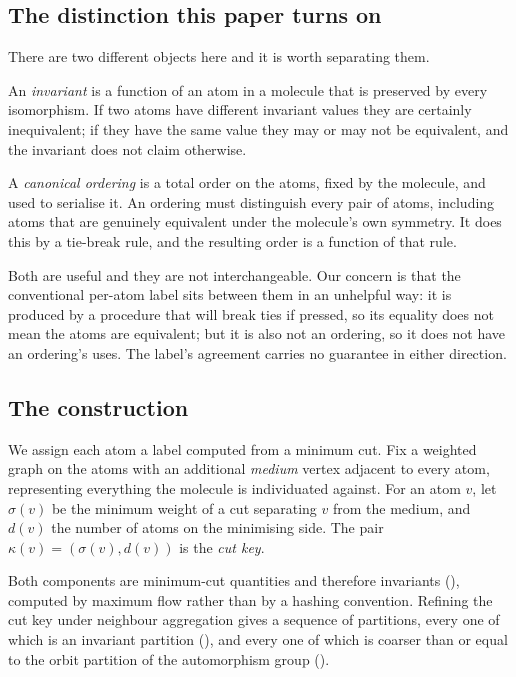 \documentclass[11pt,twocolumn,a4paper]{article}
\theoremstyle{crthm}
\theoremstyle{definition}
\theoremstyle{remark}
\newcommand{\sep}{\sigma}
\newcommand{\dep}{d}
\newcommand{\key}{\kappa}
\begin{document}
\subsection{The distinction this paper turns on}

There are two different objects here and it is worth separating them.

An \emph{invariant} is a function of an atom in a molecule that is
preserved by every isomorphism. If two atoms have different invariant
values they are certainly inequivalent; if they have the same value they
may or may not be equivalent, and the invariant does not claim otherwise.

A \emph{canonical ordering} is a total order on the atoms, fixed by the
molecule, and used to serialise it. An ordering must distinguish every
pair of atoms, including atoms that are genuinely equivalent under the
molecule's own symmetry. It does this by a tie-break rule, and the
resulting order is a function of that rule.

Both are useful and they are not interchangeable. Our concern is that the
conventional per-atom label sits between them in an unhelpful way: it is
produced by a procedure that will break ties if pressed, so its equality
does not mean the atoms are equivalent; but it is also not an ordering,
so it does not have an ordering's uses. The label's agreement carries no
guarantee in either direction.

\subsection{The construction}

We assign each atom a label computed from a minimum cut. Fix a weighted
graph on the atoms with an additional \emph{medium} vertex adjacent to
every atom, representing everything the molecule is individuated against.
For an atom $v$, let $\sep(v)$ be the minimum weight of a cut separating
$v$ from the medium, and $\dep(v)$ the number of atoms on the minimising
side. The pair $\key(v)=(\sep(v),\dep(v))$ is the \emph{cut key}.

Both components are minimum-cut quantities and therefore invariants
(), computed by maximum flow
\citep{fordfulkerson1956,stoer1997} rather than by a hashing convention.
Refining the cut key under neighbour aggregation gives a sequence of
partitions, every one of which is an invariant partition
(), and every one of which is coarser than or
equal to the orbit partition of the automorphism group
().
\end{document}
